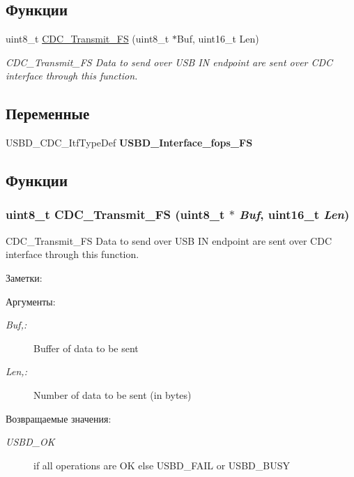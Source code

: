 \subsection*{Функции}
\begin{CompactItemize}
\item 
uint8\_\-t \hyperlink{group___u_s_b_d___c_d_c___i_f_g5137d6201dbdef2bf351c5b4941c24f4}{CDC\_\-Transmit\_\-FS} (uint8\_\-t $\ast$Buf, uint16\_\-t Len)
\begin{CompactList}\small\item\em CDC\_\-Transmit\_\-FS Data to send over USB IN endpoint are sent over CDC interface through this function. \item\end{CompactList}\end{CompactItemize}
\subsection*{Переменные}
\begin{CompactItemize}
\item 
USBD\_\-CDC\_\-ItfTypeDef \textbf{USBD\_\-Interface\_\-fops\_\-FS}
\end{CompactItemize}


\subsection{Функции}
\hypertarget{group___u_s_b_d___c_d_c___i_f_g5137d6201dbdef2bf351c5b4941c24f4}{
\subsubsection[{CDC\_\-Transmit\_\-FS}]{\setlength{\rightskip}{0pt plus 5cm}uint8\_\-t CDC\_\-Transmit\_\-FS (uint8\_\-t $\ast$ {\em Buf}, \/  uint16\_\-t {\em Len})}}
\label{group___u_s_b_d___c_d_c___i_f_g5137d6201dbdef2bf351c5b4941c24f4}


CDC\_\-Transmit\_\-FS Data to send over USB IN endpoint are sent over CDC interface through this function. 

\begin{Desc}
\item[Заметки:]\end{Desc}
\begin{Desc}
\item[Аргументы:]
\begin{description}
\item[{\em Buf,:}]Buffer of data to be sent \item[{\em Len,:}]Number of data to be sent (in bytes) \end{description}
\end{Desc}
\begin{Desc}
\item[Возвращаемые значения:]
\begin{description}
\item[{\em USBD\_\-OK}]if all operations are OK else USBD\_\-FAIL or USBD\_\-BUSY \end{description}
\end{Desc}


